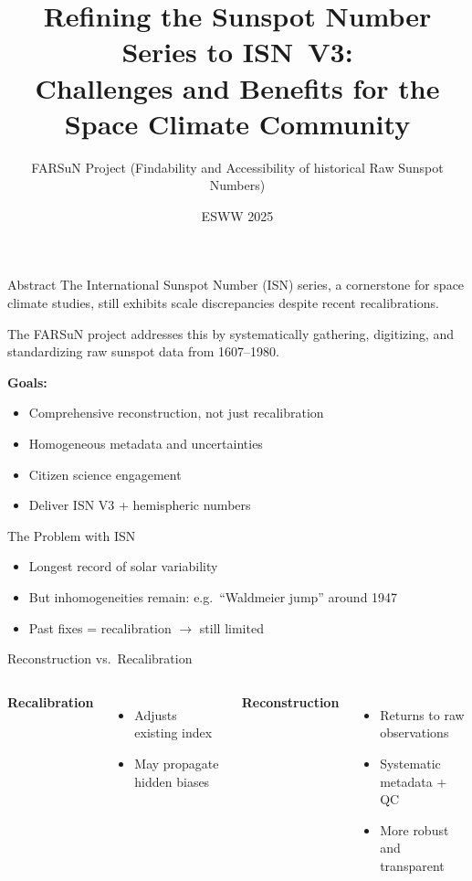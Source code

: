 \documentclass{beamer}
\title[Refining ISN to V3]{Refining the Sunspot Number Series to ISN~V3:\\ Challenges and Benefits for the Space Climate Community}
\author{FARSuN Project (Findability and Accessibility of historical Raw Sunspot Numbers)}
\institute{Royal Observatory of Belgium (ROB) / SILSO and collaborators}
\date{ESWW 2025}
\begin{document}
\begin{frame}
  \titlepage
\end{frame}

\begin{frame}{Abstract}
The International Sunspot Number (ISN) series, a cornerstone for space climate studies, still exhibits scale discrepancies despite recent recalibrations.  

\medskip
The FARSuN project addresses this by systematically gathering, digitizing, and standardizing raw sunspot data from 1607--1980.  
\medskip

\textbf{Goals:}
\begin{itemize}
  \item Comprehensive reconstruction, not just recalibration
  \item Homogeneous metadata and uncertainties
  \item Citizen science engagement
  \item Deliver ISN V3 + hemispheric numbers
\end{itemize}
\end{frame}

\begin{frame}{The Problem with ISN}
\begin{itemize}
  \item Longest record of solar variability
  \item But inhomogeneities remain: e.g.\ “Waldmeier jump” around 1947
  \item Past fixes = recalibration $\rightarrow$ still limited
\end{itemize}
\end{frame}

\begin{frame}{Reconstruction vs.\ Recalibration}
\begin{columns}
\textbf{Recalibration}
\begin{itemize}
  \item Adjusts existing index
  \item May propagate hidden biases
\end{itemize}

\textbf{Reconstruction}
\begin{itemize}
  \item Returns to raw observations
  \item Systematic metadata + QC
  \item More robust and transparent
\end{itemize}
\end{columns}
\end{frame}
\end{document}
